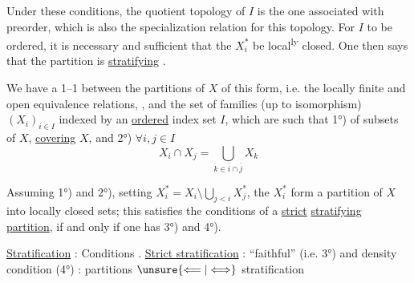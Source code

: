 Under these conditions, the quotient topology of $I$ is the one
associated with  preorder, which is also
the specialization relation for this topology.
For $I$ to be ordered, it is necessary and sufficient that the
$X_i^*$ be local\textsuperscript{ly} closed. One then says that the partition is
\uline{stratifying} .

We have a 1--1  between the
 partitions of $X$ of this form, i.e. the locally
finite and open equivalence relations, , and the set of families (up to isomorphism)
$(X_i)_{i\in I}$ indexed by an \uline{ordered}
 index set $I$,
which are such that 1°) \uline{}  of
  subsets of $X$,  \uline{covering} $X$, and 2°) $\forall i,j\in I$
\[
X_i\cap X_j=\bigcup_{k\in\overline i\cap\overline j}X_k
\]


Assuming 1°) and 2°), setting $X_i^*=X_i\setminus\bigcup_{j<i}X_j^*$,
the $X_i^*$ form a   partition of $X$ into
locally closed sets; this satisfies the conditions
of a \uline{strict} \uline{stratifying} \uline{partition},  if and only if
one has 3°) and 4°).

\uline{Stratification} : Conditions . \uline{Strict stratification} : ``faithful'' (i.e.
3°) and density condition (4°) :  partitions $\unsure{\Longleftarrow|\Longleftrightarrow}$  stratification
